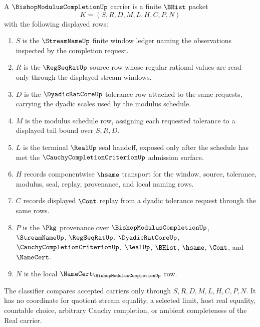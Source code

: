 \begin{definition}
\label{def:bishop-modulus-completion-carrier}
A $\BishopModulusCompletionUp$ carrier is a finite $\BHist$ packet
$$
K=(S,R,D,M,L,H,C,P,N)
$$
with the following displayed rows:
\begin{enumerate}
\item $S$ is the $\StreamNameUp$ finite window ledger naming the observations inspected by the completion request.
\item $R$ is the $\RegSeqRatUp$ source row whose regular rational values are read only through the displayed stream windows.
\item $D$ is the $\DyadicRatCoreUp$ tolerance row attached to the same requests, carrying the dyadic scales used by the modulus schedule.
\item $M$ is the modulus schedule row, assigning each requested tolerance to a displayed tail bound over $S,R,D$.
\item $L$ is the terminal $\RealUp$ seal handoff, exposed only after the schedule has met the $\CauchyCompletionCriterionUp$ admission surface.
\item $H$ records componentwise $\hsame$ transport for the window, source, tolerance, modulus, seal, replay, provenance, and local naming rows.
\item $C$ records displayed $\Cont$ replay from a dyadic tolerance request through the same rows.
\item $P$ is the $\Pkg$ provenance over $\BishopModulusCompletionUp$, $\StreamNameUp$, $\RegSeqRatUp$, $\DyadicRatCoreUp$, $\CauchyCompletionCriterionUp$, $\RealUp$, $\BHist$, $\hsame$, $\Cont$, and $\NameCert$.
\item $N$ is the local $\NameCert_{\BishopModulusCompletionUp}$ row.
\end{enumerate}
The classifier compares accepted carriers only through $S,R,D,M,L,H,C,P,N$. It has no coordinate for quotient stream equality, a selected limit, host real equality, countable choice, arbitrary Cauchy completion, or ambient completeness of the Real carrier.
\end{definition}


